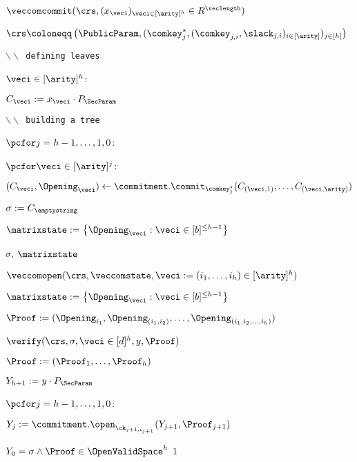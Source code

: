 \begin{figure}[t]
{{\begin{minipage}[t]{0.55\textwidth}
					\underline{$\veccomcommit(\crs, (x_{\veci})_{\veci \in [\arity]^h} \in R^{\veclength})$}
					\begin{algorithmic}[1]
						\item $\crs \coloneqq \left(\PublicParam, (\comkey^\star_j,(\comkey_{j,i},\slack_{j,i})_{i\in [\arity]})_{j \in [h]} \right)$
						\item \texttt{$\backslash \backslash$ defining leaves}
						\item \pcfor $\veci \in [\arity]^h$:
						\item \quad $C_{\veci} := x_{\veci} \cdot P_\SecParam$
						\item \texttt{$\backslash \backslash$ building a tree}
						\item $\pcfor j = h-1,\ldots,1,0$:
						\item \quad $\pcfor \veci \in [\arity]^j$:
						\item \quad \quad $(C_\veci, \Opening_\veci) \gets \commitment.\commit_{\comkey^\star_j}(C_{(\veci,1)},\ldots,C_{(\veci,\arity)})$
						\item $\sigma := C_{\emptystring}$
						\item $\matrixstate := \left\{ \Opening_{\veci} : \veci \in [b]^{\leq h-1}\right\}$
						\item \Return $\sigma$, $\matrixstate$
					\end{algorithmic}
				\end{minipage}
				\begin{minipage}[t]{0.55\textwidth}
					\underline{$\veccomopen(\crs, \veccomstate, \veci := (i_1,\ldots,i_h) \in [\arity]^h)$}
					\begin{algorithmic}[1]
						\item $\matrixstate := \left\{ \Opening_{\veci} : \veci \in [b]^{\leq h-1}\right\}$
						\item \Return $\Proof := (\Opening_{i_1},\Opening_{(i_1,i_2)},\ldots,\Opening_{(i_1,i_2,\ldots,i_h)})$
					\end{algorithmic}
					\underline{$\verify(\crs, \sigma, \veci \in [d]^h ,  y, \Proof)$}
					\begin{algorithmic}[1]
						\item $\Proof := (\Proof_1,\ldots,\Proof_{h})$
						\item $Y_{h+1} := y \cdot P_\SecParam$
						\item $\pcfor j = h-1,\ldots,1,0$:
						\item \quad $Y_{j} := \commitment.\open_{\ck_{j+1,i_{j+1}}}(Y_{j+1}, \Proof_{j+1})$
						\item \pcif $Y_0 = \sigma \land \Proof \in \OpenValidSpace^h$ \pcthen \pcreturn $1$

\end{algorithmic}
\end{minipage}}}
\end{figure}
